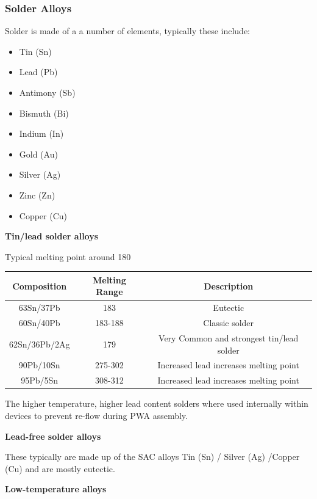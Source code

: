 \documentclass{article}
\begin{document}
		\subsubsection{Solder Alloys}
		Solder is made of a a number of elements, typically these include:
		\begin{itemize}
			\item Tin (Sn)
			\item Lead (Pb)
			\item Antimony (Sb)
			\item Bismuth (Bi)
			\item Indium (In)
			\item Gold (Au)
			\item Silver (Ag)
			\item Zinc (Zn)
			\item Copper (Cu)
		\end{itemize}
		
		
		\textbf{Tin/lead solder alloys}
		 
		 
		 Typical melting point around 180\degree
		\begin{center}
 			\begin{tabular}{||c c c||} 
 			\hline
 			\textbf{Composition} & \textbf{Melting Range} & \textbf{Description} \\ [0.5ex] 
 			\hline\hline
 			63Sn/37Pb & 183\degree & Eutectic  \\ 
 			\hline
 			60Sn/40Pb & 183-188\degree & Classic solder \\
 			\hline
 			62Sn/36Pb/2Ag & 179\degree & Very Common and strongest tin/lead solder \\
 			\hline
 			90Pb/10Sn & 275-302\degree & Increased lead increases melting point \\
 			\hline
 			95Pb/5Sn & 308-312\degree & Increased lead increases melting point \\
 			\hline
			\end{tabular}
		\end{center}
The higher temperature, higher lead content solders where used internally within devices to prevent re-flow during PWA assembly.
		
		
		\textbf{Lead-free solder alloys}
		
		
		These typically are made up of the SAC alloys Tin (Sn) / Silver (Ag) /Copper (Cu) and are mostly eutectic.
		 
		
		\textbf{Low-temperature alloys}
		
\end{document}
